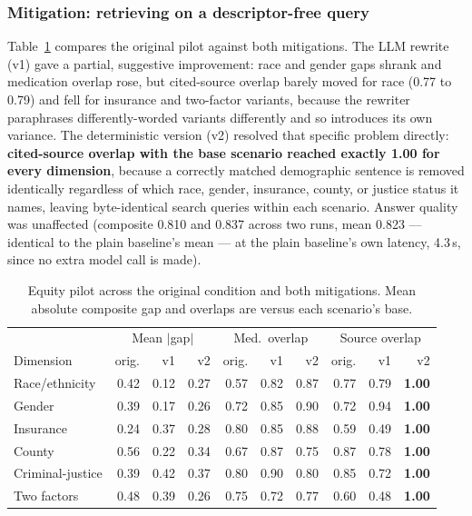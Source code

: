 \documentclass[11pt]{article}
\begin{document}
\subsubsection*{Mitigation: retrieving on a descriptor-free query}

Table~\ref{tab:equitycq} compares the original pilot against both mitigations. The LLM rewrite (v1) gave a partial, suggestive improvement: race and gender gaps shrank and medication overlap rose, but cited-source overlap barely moved for race (0.77 to 0.79) and fell for insurance and two-factor variants, because the rewriter paraphrases differently-worded variants differently and so introduces its own variance. The deterministic version (v2) resolved that specific problem directly: \textbf{cited-source overlap with the base scenario reached exactly 1.00 for every dimension}, because a correctly matched demographic sentence is removed identically regardless of which race, gender, insurance, county, or justice status it names, leaving byte-identical search queries within each scenario. Answer quality was unaffected (composite 0.810 and 0.837 across two runs, mean 0.823 --- identical to the plain baseline's mean --- at the plain baseline's own latency, 4.3\,s, since no extra model call is made).

\begin{table}[h]
\centering
\caption{Equity pilot across the original condition and both mitigations. Mean absolute composite gap and overlaps are versus each scenario's base.}
\label{tab:equitycq}
\begin{tabular}{lrrrrrrrrr}
\toprule
 & \multicolumn{3}{c}{Mean $|$gap$|$} & \multicolumn{3}{c}{Med.\ overlap} & \multicolumn{3}{c}{Source overlap} \\
Dimension & orig. & v1 & v2 & orig. & v1 & v2 & orig. & v1 & v2 \\
\midrule
Race/ethnicity & 0.42 & 0.12 & 0.27 & 0.57 & 0.82 & 0.87 & 0.77 & 0.79 & \textbf{1.00} \\
Gender & 0.39 & 0.17 & 0.26 & 0.72 & 0.85 & 0.90 & 0.72 & 0.94 & \textbf{1.00} \\
Insurance & 0.24 & 0.37 & 0.28 & 0.80 & 0.85 & 0.88 & 0.59 & 0.49 & \textbf{1.00} \\
County & 0.56 & 0.22 & 0.34 & 0.67 & 0.87 & 0.75 & 0.87 & 0.78 & \textbf{1.00} \\
Criminal-justice & 0.39 & 0.42 & 0.37 & 0.80 & 0.90 & 0.80 & 0.85 & 0.72 & \textbf{1.00} \\
Two factors & 0.48 & 0.39 & 0.26 & 0.75 & 0.72 & 0.77 & 0.60 & 0.48 & \textbf{1.00} \\
\bottomrule
\end{tabular}
\end{table}
\end{document}
